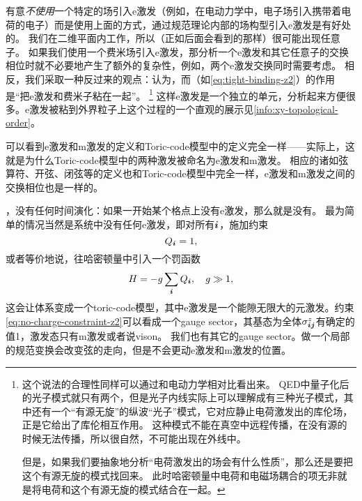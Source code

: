 有意\emph{不使用}一个特定的场引入e激发（例如，在电动力学中，电子场引入携带着电荷的电子）而是使用上面的方式，通过规范理论内部的场构型引入e激发是有好处的。
我们在二维平面内工作，所以（正如后面会看到的那样）很可能出现任意子。
如果我们使用一个费米场引入e激发，那分析一个e激发和其它任意子的交换相位时就不必要地产生了额外的复杂性，例如，两个e激发交换同时需要考虑。
相反，我们采取一种反过来的观点：认为，而（如\eqref{eq:tight-binding-z2}）的作用是“把e激发和费米子粘在一起”。%
\footnote{
    这个说法的合理性同样可以通过和电动力学相对比看出来。
    QED中量子化后的光子模式就只有两个，但是光子内线实际上可以理解成有三种光子模式，其中还有一个“有源无旋”的纵波“光子”模式，它对应静止电荷激发出的库伦场，正是它给出了库伦相互作用。
    这种模式不能在真空中远程传播，在没有源的时候无法传播，所以很自然，不可能出现在外线中。

    但是，如果我们要抽象地分析“电荷激发出的场会有什么性质”，那么还是要把这个有源无旋的模式找回来。
    此时哈密顿量中电荷和电磁场耦合的项无非就是将电荷和这个有源无旋的模式结合在一起。
}%
这样e激发是一个独立的单元，分析起来方便很多。e激发被粘到外界粒子上这个过程的一个直观的展示见\autoref{info:xy-topological-order}。

可以看到e激发和m激发的定义和Toric-code模型中的定义完全一样——实际上，这就是为什么Toric-code模型中的两种激发被命名为e激发和m激发。
相应的诸如弦算符、开弦、闭弦等的定义也和Toric-code模型中完全一样，e激发和m激发之间的交换相位也是一样的。

，没有任何时间演化：如果一开始某个格点上没有e激发，那么就是没有。
最为简单的情况当然是系统中没有任何e激发，即对所有$\vb*{i}$，施加约束
\begin{equation}
    Q_{\vb*{i}} = 1,
    \label{eq:no-charge-constraint-z2}
\end{equation}
或者等价地说，往哈密顿量中引入一个罚函数
\begin{equation}
    H = - g \sum_{\vb*{i}} Q_{\vb*{i}} , \quad g \gg 1,
    \label{eq:z2-charge-hamiltonian}
\end{equation}
这会让体系变成一个toric-code模型，其中e激发是一个能隙无限大的元激发。约束\eqref{eq:no-charge-constraint-z2}可以看成一个gauge sector，其基态为全体$\sigma^z_{\vb*{i} \vb*{j}}$有确定的值1，激发态只有m激发或者说vison。
我们也有其它的gauge sector。做一个局部的规范变换会改变弦的走向，但是不会更动e激发和m激发的位置。

